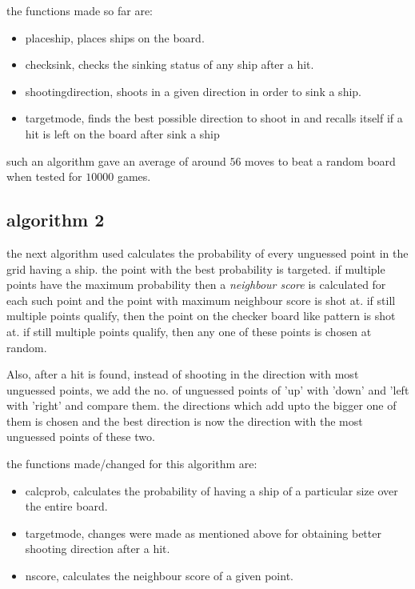 \documentclass{article}
\begin{document}
	the functions made so far are:
	\begin{itemize}
   		
   		\item placeship, places ships on the board.
   		\item checksink, checks the sinking status of any ship after a hit.
   		\item shootingdirection, shoots in a given direction in order to sink a ship.
   		\item targetmode, finds the best possible direction to shoot in and recalls itself if a hit is left on the board after sink a ship
	
	\end{itemize}
	
	such an algorithm gave an average of around $56$ moves to beat a random board when tested for $10000$ games.
	
	\subsection{algorithm 2}
	
	the next algorithm used calculates the probability of every unguessed point in the grid having a ship. the point with the best probability is targeted. if multiple points have the maximum probability then a \textit{neighbour score} is calculated for each such point and the point with maximum neighbour score is shot at. if still multiple points qualify, then the point on the checker board like pattern is shot at. if still multiple points qualify, then any one of these points is chosen at random.
	
	Also, after a hit is found, instead of shooting in the direction with most unguessed points, we add the no. of unguessed points of 'up' with 'down' and 'left with 'right' and compare them. the directions which add upto the bigger one of them is chosen and the best direction is now the direction with the most unguessed points of these two.
	
	the functions made/changed for this algorithm are:
	\begin{itemize}
	
		\item calcprob, calculates the probability of having a ship of a particular size over the entire board.
		\item targetmode, changes were made as mentioned above for obtaining better shooting direction after a hit.
		\item nscore, calculates the neighbour score of a given point.
	\end{itemize}
	
\end{document}
